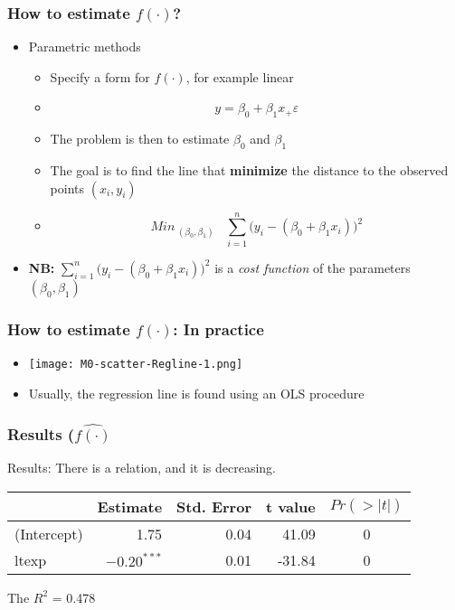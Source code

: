 \documentclass[xcolor=x11names,compress, aspectratio=169]{beamer}
\renewcommand{\(}{\begin{columns}}
\renewcommand{\)}{\end{columns}}
\newcommand{\<}[1]{\begin{column}{#1}}
\renewcommand{\>}{\end{column}}
\begin{document}
\begin{frame} %
\frametitle{How to estimate $f(\cdot)$?}
 \begin{itemize}
  \item<+-> Parametric methods
   \begin{itemize}
      \item<+->[] Specify a form for $f(\cdot)$, for example linear
      \item<+->[] $$y = \beta_0 + \beta_1 x_ + \varepsilon$$
      \item<+-> The problem is then to estimate $ \beta_0$ and $\beta_1$
      \item<+-> The goal is to find the line that \textbf{minimize} the distance to the observed points $(x_i, y_i)$
      \item<+->[] $$Min_{\; (\beta_0 , \beta_1)} \;  \; \; \sum_{i=1}^{n} \bigl(y_i - (\beta_0 + \beta_1 x_i)\bigr)^2$$
 \end{itemize}
 \item<+->[] \textbf{NB:} $\sum_{i=1}^{n} \bigl(y_i - (\beta_0 + \beta_1 x_i)\bigr)^2$ is a \textit{cost function} of the parameters $ (\beta_0,\beta_1)$
 \end{itemize}
\end{frame}



\begin{frame} %
\frametitle{How to estimate $f(\cdot)$: In practice}
 \begin{itemize}
  \item<+->[] \texttt{[image: M0-scatter-Regline-1.png]}
  \item<+->[] Usually, the regression line is found using an OLS procedure
 \end{itemize}
\end{frame}


\begin{frame} %
\frametitle{Results ($ \widehat{f(\cdot)}$}
Results:  There is a relation, and it is decreasing. 
\begin{table}
\centering
\begin{tabular}{l|rrrc}
\hline
  & Estimate & Std. Error & t value & $Pr(>|t|)$\\
\hline
(Intercept) & 1.75 & 0.04 & 41.09 & 0\\
\hline
ltexp & $-0.20^{***}$ & 0.01 & -31.84 & 0\\
\hline
\end{tabular}
\end{table}
 The  $R^2$ = 0.478

\end{frame}
\end{document}
